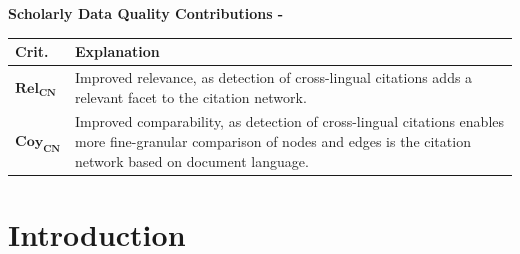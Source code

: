 \begin{infobox-progress}
      \textbf{Scholarly Data Quality Contributions - \cite{Saier2020xling,Saier2021}}\vspace{0.5em}

      \begin{tabular}{lp{10.9cm}}
        \toprule
        Crit. & Explanation \\
        \midrule
        $\mathbf{Rel_{CN}}$ & Improved relevance, as detection of cross-lingual citations adds a relevant facet to the citation network. \\
        $\mathbf{Coy_{CN}}$ & Improved comparability, as detection of cross-lingual citations enables more fine-granular comparison of nodes and edges is the citation network based on document language. \\
        \bottomrule
      \end{tabular}
\end{infobox-progress}


\section{Introduction}

